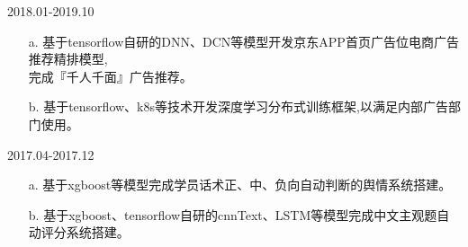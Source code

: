 \documentclass[margin]{res}
\begin{document}
\begin{resume}
\begin{itemize}
                \end{itemize}
 
                {} \hfill 2018.01-2019.10 \\
                 \begin{itemize}  \itemsep -2pt %
                    \item[a.] 基于tensorflow自研的DNN、DCN等模型开发京东APP首页广告位电商广告推荐精排模型,\\完成『千人千面』广告推荐。
                    \item[b.] 基于tensorflow、k8s等技术开发深度学习分布式训练框架,以满足内部广告部门使用。
                 \end{itemize} 

                {} \hfill 2017.04-2017.12 \\
                \begin{itemize}
                    \item[a.] 基于xgboost等模型完成学员话术正、中、负向自动判断的舆情系统搭建。
                    \item[b.] 基于xgboost、tensorflow自研的cnnText、LSTM等模型完成中文主观题自动评分系统搭建。 
                \end{itemize} 


\end{resume}
\end{document}
